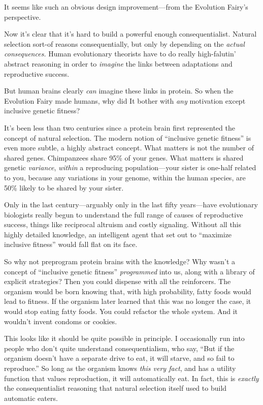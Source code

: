 {
 It seems like such an obvious design improvement---from the
Evolution Fairy's perspective.}

{
 Now it's clear that it's hard to
build a powerful enough consequentialist. Natural selection sort-of
reasons consequentially, but only by depending on the \textit{actual
consequences.} Human evolutionary theorists have to do really
high-falutin' abstract reasoning in order to
\textit{imagine} the links between adaptations and reproductive
success.}

{
 But human brains clearly \textit{can} imagine these links in
protein. So when the Evolution Fairy made humans, why did It bother
with \textit{any} motivation except inclusive genetic fitness?}

{
 It's been less than two centuries since a protein
brain first represented the concept of natural selection. The modern
notion of ``inclusive genetic
fitness'' is even more subtle, a highly abstract
concept. What matters is not the number of shared genes. Chimpanzees
share 95\% of your genes. What matters is shared genetic
\textit{variance}, \textit{within} a reproducing population---your
sister is one-half related to you, because any variations in your
genome, within the human species, are 50\% likely to be shared by your
sister.}

{
 Only in the last century---arguably only in the last fifty
years---have evolutionary biologists really begun to understand the
full range of causes of reproductive success, things like reciprocal
altruism and costly signaling. Without all this highly detailed
knowledge, an intelligent agent that set out to
``maximize inclusive fitness'' would
fall flat on its face.}

{
 So why not preprogram protein brains with the knowledge? Why
wasn't a concept of ``inclusive
genetic fitness'' \textit{programmed} into us, along
with a library of explicit strategies? Then you could dispense with all
the reinforcers. The organism would be born knowing that, with high
probability, fatty foods would lead to fitness. If the organism later
learned that this was no longer the case, it would stop eating fatty
foods. You could refactor the whole system. And it
wouldn't invent condoms or cookies.}

{
 This looks like it should be quite possible in principle. I
occasionally run into people who don't quite understand
consequentialism, who say, ``But if the organism
doesn't have a separate drive to eat, it will starve,
and so fail to reproduce.'' So long as the organism
knows \textit{this very fact}, and has a utility function that values
reproduction, it will automatically eat. In fact, this is
\textit{exactly} the consequentialist reasoning that natural selection
itself used to build automatic eaters.}

